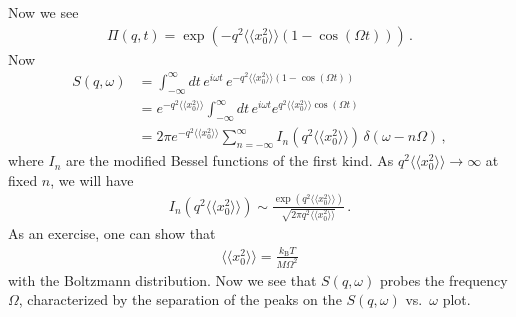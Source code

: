 \documentclass[11pt, oneside]{book}
\theoremstyle{break}
\theoremstyle{break}
\begin{document}
Now we see 
\begin{align*}
\Pi(q,t) = \exp\left( -q^2  \langle\langle x_0^2\rangle\rangle (1 - \cos(\Omega t)) \right)\,.
\end{align*}
Now 
\begin{align*}
S(q,\omega) 
&= \int_{-\infty}^\infty dt\, e^{i\omega t}\, e^{-q^2\langle \langle x_0^2 \rangle\rangle (1- \cos(\Omega t))}\\
&= e^{-q^2\langle\langle x_0^2\rangle\rangle} \int_{-\infty}^\infty dt\, e^{i\omega t}e^{q^2 \langle\langle x_0^2\rangle\rangle \cos(\Omega t)}\\
&= 2\pi e^{-q^2 \langle \langle x_0^2\rangle\rangle} \sum_{n=-\infty}^\infty I_n\left( q^2\langle\langle x_0^2\rangle\rangle \right) \, \delta(\omega - n\Omega)\,,
\end{align*}
where $I_n$ are the modified Bessel functions of the first kind. As $q^2 \langle\langle x_0^2\rangle\rangle \to \infty$ at fixed $n$, we will have
\begin{align*}
I_n (q^2 \langle\langle x_0^2\rangle\rangle) \sim \frac{\exp(q^2\langle\langle x_0^2\rangle\rangle)}{\sqrt{2\pi q^2\langle\langle x_0^2\rangle\rangle}}\,.
\end{align*}
As an exercise, one can show that 
\begin{align*}
\langle\langle x_0^2\rangle\rangle = \frac{k_{\text{B}}T}{M\Omega^2}
\end{align*}
with the Boltzmann distribution. Now we see that $S(q,\omega)$ probes the frequency $\Omega$, characterized by the separation of the peaks on the $S(q,\omega)$ vs.\ $\omega$ plot. \\
\end{document}
